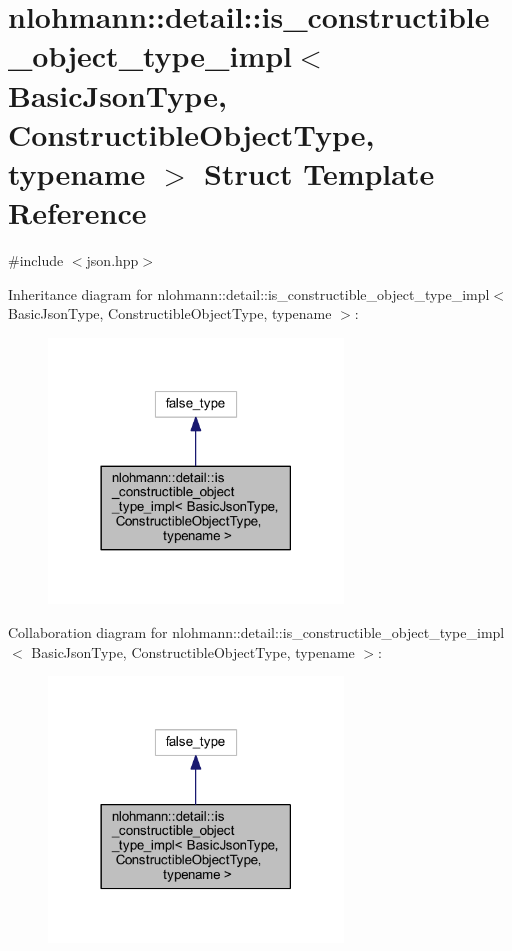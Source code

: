 \hypertarget{structnlohmann_1_1detail_1_1is__constructible__object__type__impl}{}\section{nlohmann\+::detail\+::is\+\_\+constructible\+\_\+object\+\_\+type\+\_\+impl$<$ Basic\+Json\+Type, Constructible\+Object\+Type, typename $>$ Struct Template Reference}
\label{structnlohmann_1_1detail_1_1is__constructible__object__type__impl}


{\ttfamily \#include $<$json.\+hpp$>$}



Inheritance diagram for nlohmann\+::detail\+::is\+\_\+constructible\+\_\+object\+\_\+type\+\_\+impl$<$ Basic\+Json\+Type, Constructible\+Object\+Type, typename $>$\+:
\nopagebreak
\begin{figure}[H]
\begin{center}
\leavevmode
\includegraphics[width=222pt]{structnlohmann_1_1detail_1_1is__constructible__object__type__impl__inherit__graph}
\end{center}
\end{figure}


Collaboration diagram for nlohmann\+::detail\+::is\+\_\+constructible\+\_\+object\+\_\+type\+\_\+impl$<$ Basic\+Json\+Type, Constructible\+Object\+Type, typename $>$\+:
\nopagebreak
\begin{figure}[H]
\begin{center}
\leavevmode
\includegraphics[width=222pt]{structnlohmann_1_1detail_1_1is__constructible__object__type__impl__coll__graph}
\end{center}
\end{figure}


